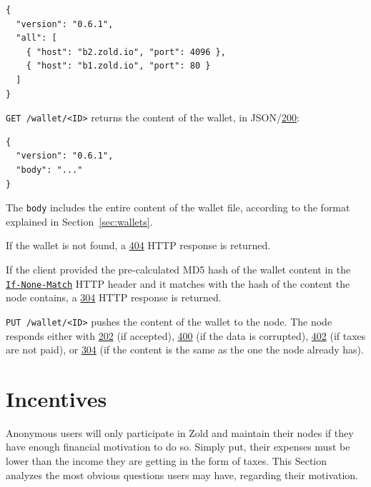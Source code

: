 \documentclass[11pt,oneside]{article}
\newcommand\dd[1]{\colorbox{gray!30}{\texttt{#1}}}
\begin{document}
\begin{verbatim}
{
  "version": "0.6.1",
  "all": [
    { "host": "b2.zold.io", "port": 4096 },
    { "host": "b1.zold.io", "port": 80 }
  ]
}\end{verbatim}

\dd{GET /wallet/<ID>} returns the content of the wallet, in
JSON/\href{https://www.w3.org/Protocols/rfc2616/rfc2616-sec10.html#sec10.2.1}{200}:

\begin{verbatim}
{
  "version": "0.6.1",
  "body": "..."
}\end{verbatim}

The \dd{body} includes the entire content of the wallet file, according
to the format explained in Section~\ref{sec:wallets}.

If the wallet is not found, a
\href{https://www.w3.org/Protocols/rfc2616/rfc2616-sec10.html#sec10.4.5}{404}
HTTP response is returned.

If the client provided the pre-calculated MD5 hash of the wallet content in the
\href{https://www.w3.org/Protocols/rfc2616/rfc2616-sec14.html#sec14.26}{\dd{If-None-Match}}
HTTP header and it matches with the hash of the
content the node contains, a
\href{https://www.w3.org/Protocols/rfc2616/rfc2616-sec10.html#sec10.3.5}{304} HTTP response is returned.

\dd{PUT /wallet/<ID>} pushes the content of the wallet to the node. The
node responds either with
\href{https://www.w3.org/Protocols/rfc2616/rfc2616-sec10.html#sec10.2.3}{202} (if accepted),
\href{https://www.w3.org/Protocols/rfc2616/rfc2616-sec10.html#sec10.4.1}{400} (if the data is corrupted),
\href{https://www.w3.org/Protocols/rfc2616/rfc2616-sec10.html#sec10.4.3}{402} (if taxes are not paid),
or
\href{https://www.w3.org/Protocols/rfc2616/rfc2616-sec10.html#sec10.3.5}{304}
(if the content is the same as the one the node already has).

\section{Incentives}\label{sec:incentives}

Anonymous users will only participate in Zold and maintain
their nodes if they have enough financial motivation to do so. Simply
put, their expenses must be lower than the income they are getting in
the form of taxes. This Section analyzes the most obvious questions users
may have, regarding their motivation.
\end{document}
